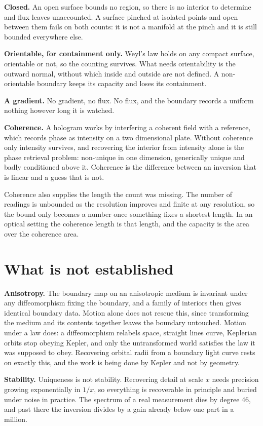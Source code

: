 \textbf{Closed.} An open surface bounds no region, so there is no interior to determine and flux leaves unaccounted. A surface pinched at isolated points and open between them fails on both counts: it is not a manifold at the pinch and it is still bounded everywhere else.

\textbf{Orientable, for containment only.} Weyl's law holds on any compact surface, orientable or not, so the counting survives. What needs orientability is the outward normal, without which inside and outside are not defined. A non-orientable boundary keeps its capacity and loses its containment.

\textbf{A gradient.} No gradient, no flux. No flux, and the boundary records a uniform nothing however long it is watched.

\textbf{Coherence.} A hologram works by interfering a coherent field with a reference, which records phase as intensity on a two dimensional plate. Without coherence only intensity survives, and recovering the interior from intensity alone is the phase retrieval problem: non-unique in one dimension, generically unique and badly conditioned above it. Coherence is the difference between an inversion that is linear and a guess that is not.

Coherence also supplies the length the count was missing. The number of readings is unbounded as the resolution improves and finite at any resolution, so the bound only becomes a number once something fixes a shortest length. In an optical setting the coherence length is that length, and the capacity is the area over the coherence area.

\section{What is not established}

\textbf{Anisotropy.} The boundary map on an anisotropic medium is invariant under any diffeomorphism fixing the boundary, and a family of interiors then gives identical boundary data. Motion alone does not rescue this, since transforming the medium and its contents together leaves the boundary untouched. Motion under a law does: a diffeomorphism relabels space, straight lines curve, Keplerian orbits stop obeying Kepler, and only the untransformed world satisfies the law it was supposed to obey. Recovering orbital radii from a boundary light curve rests on exactly this, and the work is being done by Kepler and not by geometry.

\textbf{Stability.} Uniqueness is not stability. Recovering detail at scale $x$ needs precision growing exponentially in $1/x$, so everything is recoverable in principle and buried under noise in practice. The spectrum of a real measurement dies by degree 46, and past there the inversion divides by a gain already below one part in a million.

